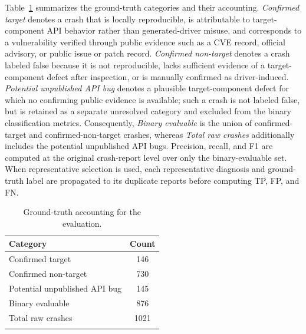 \documentclass[pdflatex,sn-basic]{sn-jnl}%
\renewcommand{\arraystretch}{1.16}%
\theoremstyle{thmstyleone}%
\theoremstyle{thmstyletwo}%
\theoremstyle{thmstylethree}%
\begin{document}
Table~\ref{tab:ground-truth-accounting} summarizes the ground-truth categories and their accounting. \emph{Confirmed target} denotes a crash that is locally reproducible, is attributable to target-component API behavior rather than generated-driver misuse, and corresponds to a vulnerability verified through public evidence such as a CVE record, official advisory, or public issue or patch record. \emph{Confirmed non-target} denotes a crash labeled false because it is not reproducible, lacks sufficient evidence of a target-component defect after inspection, or is manually confirmed as driver-induced. \emph{Potential unpublished API bug} denotes a plausible target-component defect for which no confirming public evidence is available; such a crash is not labeled false, but is retained as a separate unresolved category and excluded from the binary classification metrics. Consequently, \emph{Binary evaluable} is the union of confirmed-target and confirmed-non-target crashes, whereas \emph{Total raw crashes} additionally includes the potential unpublished API bugs. Precision, recall, and F1 are computed at the original crash-report level over only the binary-evaluable set. When representative selection is used, each representative diagnosis and ground-truth label are propagated to its duplicate reports before computing TP, FP, and FN.

\begin{table}[ht]
\caption{Ground-truth accounting for the evaluation.}
\label{tab:ground-truth-accounting}
\centering
\scriptsize
\setlength{\tabcolsep}{4pt}
\renewcommand{\arraystretch}{1.10}
\begin{tabular*}{\linewidth}{@{\extracolsep{\fill}}lc}
\toprule
\textbf{Category} & \textbf{Count} \\
\midrule
Confirmed target & 146 \\
Confirmed non-target & 730 \\
Potential unpublished API bug & 145 \\
Binary evaluable & 876 \\
Total raw crashes & 1021 \\
\botrule
\end{tabular*}
\end{table}
\end{document}

